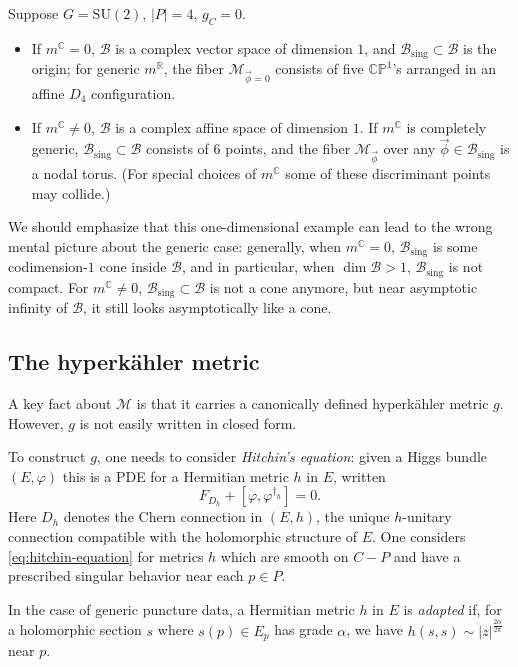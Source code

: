 \documentclass[12pt,letterpaper,reqno]{article}
\numberwithin{equation}{section}
\newcommand{\cB}{\ensuremath{\mathcal B}}
\newcommand{\cM}{\ensuremath{\mathcal M}}
\newcommand{\R}{\ensuremath{\mathbb R}}
\newcommand{\C}{\ensuremath{\mathbb C}}
\newcommand{\bbP}{\ensuremath{\mathbb P}}
\newcommand{\hk}{hyperk\"ahler\xspace}
\newcommand{\sing}{\mathrm{sing}}
\newcommand{\abs}[1]{\lvert#1\rvert}
\newcommand{\vphi}{{\vec\phi}}
\newcommand{\ti}[1]{\textit{#1}}
\newcommand{\SU}{\mathrm{SU}}
\newcommand{\insfig}[2]{

\medskip
\noindent
\begin{minipage}{\linewidth}

\makebox[\linewidth]{\texttt{[image: figures/\#1-crop.pdf]}}

\end{minipage}
\medskip

}
\newcommand{\fixme}[1]{{\color{orange}{[#1]}}}
\begin{document}
\begin{example}
Suppose $G = \SU(2)$, $\abs{P} = 4$, $g_C = 0$.
\begin{itemize}
  \item
If $m^\C = 0$, $\cB$ is a complex vector space of dimension $1$,
and $\cB_\sing \subset \cB$ is the origin;
for generic $m^\R$,
the fiber $\cM_{\vphi =0}$ consists of five $\C \bbP^1$'s
arranged in an affine $D_4$ configuration.

\item If $m^\C \neq 0$, $\cB$ is a complex affine space of dimension $1$.
If $m^\C$ is completely generic, $\cB_\sing \subset \cB$ consists
of $6$ points, and the fiber $\cM_\vphi$ over any $\vphi \in \cB_\sing$ is
a nodal torus. (For special choices of $m^\C$ some of these discriminant points 
may collide.)
\end{itemize}
\end{example}

\insfig{higgs-metric-2}{0.85}

\fixme{also do the 3-punctured $SU(3)$ case?}

We should emphasize that this one-dimensional example can lead to the
wrong mental picture about the generic case: generally,
when $m^\C = 0$, $\cB_\sing$ is some codimension-$1$ cone inside $\cB$, and in particular,
when $\dim \cB > 1$, $\cB_\sing$ is not compact. For $m^\C \neq 0$, $\cB_\sing \subset \cB$
is not a cone anymore, but near asymptotic infinity of $\cB$,
it still looks asymptotically like a cone.



\subsection{The \hk metric}

A key fact about $\cM$ is that it carries a canonically
defined \hk metric $g$. However, $g$ is not easily
written in closed form.

To construct $g$, one needs to consider \ti{Hitchin's equation}:
given a Higgs bundle $(E,\varphi)$ this is a PDE
for a Hermitian metric $h$ in $E$, written
\begin{equation} \label{eq:hitchin-equation}
  F_{D_h} + [\varphi, \varphi^{\dagger_h}] = 0.
\end{equation}
Here $D_h$ denotes the Chern connection in $(E,h)$,
the unique $h$-unitary connection compatible with
the holomorphic structure of $E$.
One considers \eqref{eq:hitchin-equation} for
metrics $h$ which are smooth on $C - P$ and
have a prescribed singular behavior near each
$p \in P$.
\begin{defn} 
In the case of generic puncture data, a Hermitian metric $h$
in $E$ is \ti{adapted} if, for a holomorphic section $s$ 
where $s(p) \in E_p$ has grade $\alpha$, we have
$h(s,s) \sim \abs{z}^{\frac{2 \alpha}{2\pi}}$ near $p$.
\end{defn}
\end{document}
